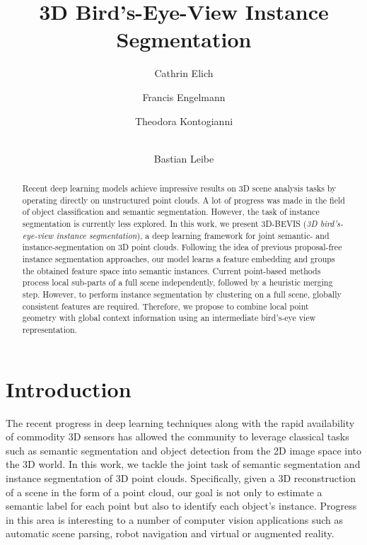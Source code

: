\documentclass[runningheads]{llncs}
\begin{document}
	\pagestyle{headings}
	\mainmatter

\def\GCPR19SubNumber{113}

\title{3D Bird's-Eye-View Instance Segmentation}

	\author{Cathrin Elich \and 
		Francis Engelmann \and 
		Theodora Kontogianni \and
	 	\\ Bastian Leibe}

	\maketitle

\begin{abstract}
  Recent deep learning models achieve impressive results on 3D scene analysis tasks by operating directly on unstructured point clouds.
A lot of progress was made in the field of object classification and semantic segmentation.
However, the task of instance segmentation is currently less explored.
In this work, we present 3D-BEVIS (\textit{3D bird's-eye-view instance segmentation}),
a deep learning framework for joint semantic- and instance-segmentation on 3D point clouds.
Following the idea of previous proposal-free instance segmentation approaches,
our model learns a feature embedding and groups the obtained feature space into semantic instances.
Current point-based methods process local sub-parts of a full scene independently, followed by a heuristic merging step.
However, to perform instance segmentation by clustering on a full scene, globally consistent features are required.
Therefore, we propose to combine local point geometry with global context information using an intermediate bird's-eye view representation. \end{abstract}



\section{Introduction}
\label{sec:introduction}
The recent progress in deep learning techniques along with the rapid availability of commodity 3D sensors \cite{realsense,matterport,fabscan}
has allowed the community to leverage classical tasks such as semantic segmentation and object detection from the 2D image space into the 3D world.
In this work, we tackle the joint task of semantic segmentation and instance segmentation of 3D point clouds.
Specifically, given a 3D reconstruction of a scene in the form of a point cloud,
our goal is not only to estimate a semantic label for each point but also to identify each object's instance.
Progress in this area is interesting to a number of computer vision applications such as automatic scene parsing, robot navigation and virtual or augmented reality.
\end{document}
